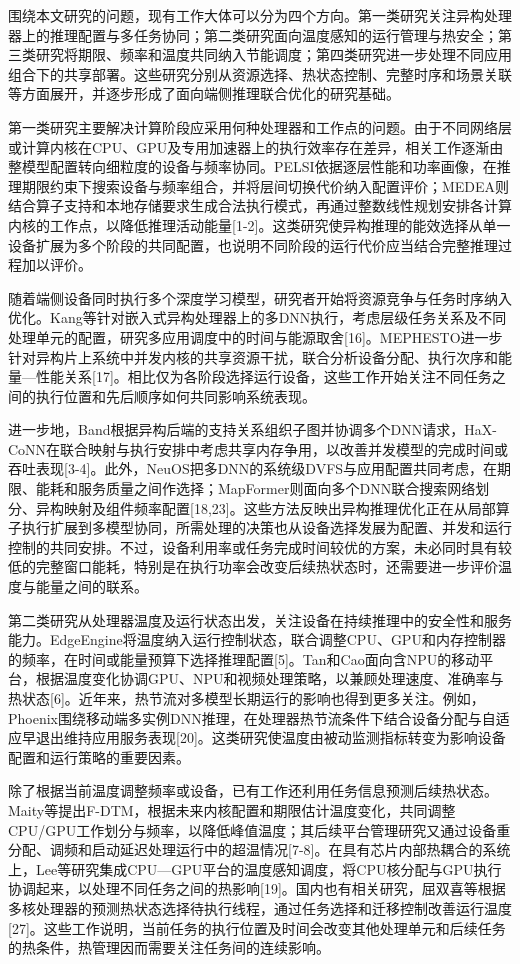 围绕本文研究的问题，现有工作大体可以分为四个方向。第一类研究关注异构处理器上的推理配置与多任务协同；第二类研究面向温度感知的运行管理与热安全；第三类研究将期限、频率和温度共同纳入节能调度；第四类研究进一步处理不同应用组合下的共享部署。这些研究分别从资源选择、热状态控制、完整时序和场景关联等方面展开，并逐步形成了面向端侧推理联合优化的研究基础。

第一类研究主要解决计算阶段应采用何种处理器和工作点的问题。由于不同网络层或计算内核在CPU、GPU及专用加速器上的执行效率存在差异，相关工作逐渐由整模型配置转向细粒度的设备与频率协同。PELSI依据逐层性能和功率画像，在推理期限约束下搜索设备与频率组合，并将层间切换代价纳入配置评价；MEDEA则结合算子支持和本地存储要求生成合法执行模式，再通过整数线性规划安排各计算内核的工作点，以降低推理活动能量{[}1-2{]}。这类研究使异构推理的能效选择从单一设备扩展为多个阶段的共同配置，也说明不同阶段的运行代价应当结合完整推理过程加以评价。

随着端侧设备同时执行多个深度学习模型，研究者开始将资源竞争与任务时序纳入优化。Kang等针对嵌入式异构处理器上的多DNN执行，考虑层级任务关系及不同处理单元的配置，研究多应用调度中的时间与能源取舍{[}16{]}。MEPHESTO进一步针对异构片上系统中并发内核的共享资源干扰，联合分析设备分配、执行次序和能量---性能关系{[}17{]}。相比仅为各阶段选择运行设备，这些工作开始关注不同任务之间的执行位置和先后顺序如何共同影响系统表现。

进一步地，Band根据异构后端的支持关系组织子图并协调多个DNN请求，HaX-CoNN在联合映射与执行安排中考虑共享内存争用，以改善并发模型的完成时间或吞吐表现{[}3-4{]}。此外，NeuOS把多DNN的系统级DVFS与应用配置共同考虑，在期限、能耗和服务质量之间作选择；MapFormer则面向多个DNN联合搜索网络划分、异构映射及组件频率配置{[}18,23{]}。这些方法反映出异构推理优化正在从局部算子执行扩展到多模型协同，所需处理的决策也从设备选择发展为配置、并发和运行控制的共同安排。不过，设备利用率或任务完成时间较优的方案，未必同时具有较低的完整窗口能耗，特别是在执行功率会改变后续热状态时，还需要进一步评价温度与能量之间的联系。

第二类研究从处理器温度及运行状态出发，关注设备在持续推理中的安全性和服务能力。EdgeEngine将温度纳入运行控制状态，联合调整CPU、GPU和内存控制器的频率，在时间或能量预算下选择推理配置{[}5{]}。Tan和Cao面向含NPU的移动平台，根据温度变化协调GPU、NPU和视频处理策略，以兼顾处理速度、准确率与热状态{[}6{]}。近年来，热节流对多模型长期运行的影响也得到更多关注。例如，Phoenix围绕移动端多实例DNN推理，在处理器热节流条件下结合设备分配与自适应早退出维持应用服务表现{[}20{]}。这类研究使温度由被动监测指标转变为影响设备配置和运行策略的重要因素。

除了根据当前温度调整频率或设备，已有工作还利用任务信息预测后续热状态。Maity等提出F-DTM，根据未来内核配置和期限估计温度变化，共同调整CPU/GPU工作划分与频率，以降低峰值温度；其后续平台管理研究又通过设备重分配、调频和启动延迟处理运行中的超温情况{[}7-8{]}。在具有芯片内部热耦合的系统上，Lee等研究集成CPU---GPU平台的温度感知调度，将CPU核分配与GPU执行协调起来，以处理不同任务之间的热影响{[}19{]}。国内也有相关研究，屈双喜等根据多核处理器的预测热状态选择待执行线程，通过任务选择和迁移控制改善运行温度{[}27{]}。这些工作说明，当前任务的执行位置及时间会改变其他处理单元和后续任务的热条件，热管理因而需要关注任务间的连续影响。

